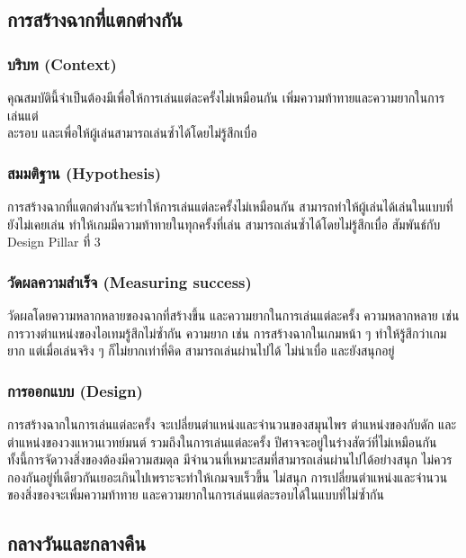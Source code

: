 \subsection{การสร้างฉากที่แตกต่างกัน}

\subsubsection{บริบท (Context)}

คุณสมบัตินี้จำเป็นต้องมีเพื่อให้การเล่นแต่ละครั้งไม่เหมือนกัน เพิ่มความท้าทายและความยากในการเล่นแต่ \\ ละรอบ และเพื่อให้ผู้เล่นสามารถเล่นซ้ำได้โดยไม่รู้สึกเบื่อ

\subsubsection{สมมติฐาน (Hypothesis)}

การสร้างฉากที่แตกต่างกันจะทำให้การเล่นแต่ละครั้งไม่เหมือนกัน สามารถทำให้ผู้เล่นได้เล่นในแบบที่ยังไม่เคยเล่น ทำให้เกมมีความท้าทายในทุกครั้งที่เล่น สามารถเล่นซ้ำได้โดยไม่รู้สึกเบื่อ สัมพันธ์กับ Design Pillar ที่ 3

\subsubsection{วัดผลความสำเร็จ (Measuring success)}

วัดผลโดยความหลากหลายของฉากที่สร้างขึ้น และความยากในการเล่นแต่ละครั้ง ความหลากหลาย เช่น การวางตำแหน่งของไอเทมรู้สึกไม่ซ้ำกัน ความยาก เช่น การสร้างฉากในเกมหน้า ๆ ทำให้รู้สึกว่าเกมยาก แต่เมื่อเล่นจริง ๆ ก็ไม่ยากเท่าที่คิด สามารถเล่นผ่านไปได้ ไม่น่าเบื่อ และยังสนุกอยู่

\subsubsection{การออกแบบ (Design)}

การสร้างฉากในการเล่นแต่ละครั้ง จะเปลี่ยนตำแหน่งและจำนวนของสมุนไพร ตำแหน่งของกับดัก และตำแหน่งของวงแหวนเวทย์มนต์ รวมถึงในการเล่นแต่ละครั้ง ปีศาจจะอยู่ในร่างสัตว์ที่ไม่เหมือนกัน ทั้งนี้การจัดวางสิ่งของต้องมีความสมดุล มีจำนวนที่เหมาะสมที่สามารถเล่นผ่านไปได้อย่างสนุก ไม่ควรกองกันอยู่ที่เดียวกันเยอะเกินไปเพราะจะทำให้เกมจบเร็วขึ้น ไม่สนุก การเปลี่ยนตำแหน่งและจำนวนของสิ่งของจะเพิ่มความท้าทาย และความยากในการเล่นแต่ละรอบได้ในแบบที่ไม่ซ้ำกัน  

\subsection{กลางวันและกลางคืน}

